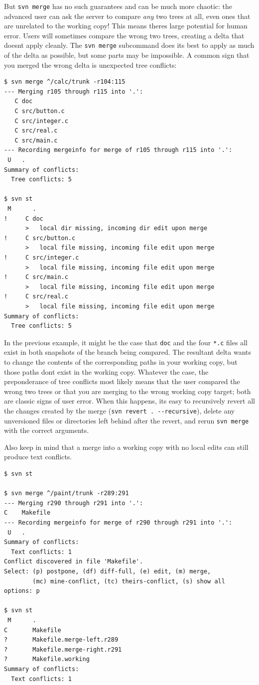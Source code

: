 But \texttt{svn\ merge} has no such guarantees and can be much more
chaotic: the advanced user can ask the server to compare \emph{any} two
trees at all, even ones that are unrelated to the working copy! This
means there\textquotesingle s large potential for human error. Users
will sometimes compare the wrong two trees, creating a delta that
doesn\textquotesingle t apply cleanly. The \texttt{svn\ merge}
subcommand does its best to apply as much of the delta as possible, but
some parts may be impossible. A common sign that you merged the wrong
delta is unexpected tree conflicts:

\begin{verbatim}
$ svn merge ^/calc/trunk -r104:115
--- Merging r105 through r115 into '.':
   C doc
   C src/button.c
   C src/integer.c
   C src/real.c
   C src/main.c
--- Recording mergeinfo for merge of r105 through r115 into '.':
 U   .
Summary of conflicts:
  Tree conflicts: 5

$ svn st
 M      .
!     C doc
      >   local dir missing, incoming dir edit upon merge
!     C src/button.c
      >   local file missing, incoming file edit upon merge
!     C src/integer.c
      >   local file missing, incoming file edit upon merge
!     C src/main.c
      >   local file missing, incoming file edit upon merge
!     C src/real.c
      >   local file missing, incoming file edit upon merge
Summary of conflicts:
  Tree conflicts: 5
\end{verbatim}

In the previous example, it might be the case that \texttt{doc} and the
four \texttt{*.c} files all exist in both snapshots of the branch being
compared. The resultant delta wants to change the contents of the
corresponding paths in your working copy, but those paths
don\textquotesingle t exist in the working copy. Whatever the case, the
preponderance of tree conflicts most likely means that the user compared
the wrong two trees or that you are merging to the wrong working copy
target; both are classic signs of user error. When this happens,
it\textquotesingle s easy to recursively revert all the changes created
by the merge (\texttt{svn\ revert\ .\ -\/-recursive}), delete any
unversioned files or directories left behind after the revert, and rerun
\texttt{svn\ merge} with the correct arguments.

Also keep in mind that a merge into a working copy with no local edits
can still produce text conflicts.

\begin{verbatim}
$ svn st

$ svn merge ^/paint/trunk -r289:291
--- Merging r290 through r291 into '.':
C    Makefile
--- Recording mergeinfo for merge of r290 through r291 into '.':
 U   .
Summary of conflicts:
  Text conflicts: 1
Conflict discovered in file 'Makefile'.
Select: (p) postpone, (df) diff-full, (e) edit, (m) merge,
        (mc) mine-conflict, (tc) theirs-conflict, (s) show all options: p

$ svn st
 M      .
C       Makefile
?       Makefile.merge-left.r289
?       Makefile.merge-right.r291
?       Makefile.working
Summary of conflicts:
  Text conflicts: 1
\end{verbatim}

